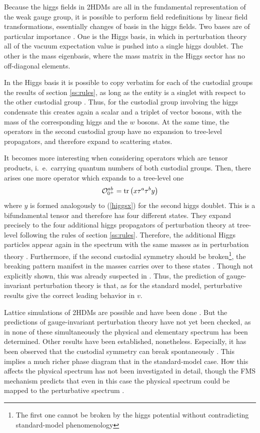 \documentclass[final,twoside,12pt]{article}
\newcommand*{\no}{\noindent}
\newcommand*{\be}{\begin{equation}}
\newcommand*{\ee}{\end{equation}}
\newcommand*{\pref}[1]{(\ref{#1})}
\newcommand*{\tr}{\mathrm{tr}}
\newcommand*{\1}{1\!\!\!\bot}
\newcommand*{\op}{{\cal O}}
\begin{document}
Because the higgs fields in 2HDMs are all in the fundamental representation of the weak gauge group, it is possible to perform field redefinitions by linear field transformations, essentially changes of basis in the higgs fields. Two bases are of particular importance \cite{Branco:2011iw,Ivanov:2017dad}. One is the Higgs basis, in which in perturbation theory all of the vacuum expectation value is pushed into a single higgs doublet. The other is the mass eigenbasis, where the mass matrix in the Higgs sector has no off-diagonal elements.

In the Higgs basis it is possible to copy verbatim for each of the custodial groups the results of section \ref{ss:rules}, as long as the entity is a singlet with respect to the other custodial group \cite{Maas:2016qpu}. Thus, for the custodial group involving the higgs condensate this creates again a scalar and a triplet of vector bosons, with the mass of the corresponding higgs and the $w$ bosons. At the same time, the operators in the second custodial group have no expansion to tree-level propagators, and therefore expand to scattering states.

It becomes more interesting when considering operators which are tensor products, i.\ e.\ carrying quantum numbers of both custodial groups. Then, there arises one more operator which expands to a tree-level one \cite{Maas:2016qpu}
\be
\op_{0^+}^{ab}=\tr\left(x\tau^a\tau^by\right)\label{hdmtensor}
\ee
\no where $y$ is formed analogously to \pref{higgsx} for the second higgs doublet. This is a bifundamental tensor and therefore has four different states. They expand precisely to the four additional higgs propagators of perturbation theory at tree-level following the rules of section \ref{ss:rules}. Therefore, the additional Higgs particles appear again in the spectrum with the same masses \cite{Maas:2016qpu} as in perturbation theory \cite{Branco:2011iw,Ivanov:2017dad}. Furthermore, if the second custodial symmetry should be broken\footnote{The first one cannot be broken by the higgs potential without contradicting standard-model phenomenology}, the breaking pattern manifest in the masses carries over to these states \cite{Maas:2016qpu}. Though not explicitly shown, this was already suspected in \cite{Frohlich:1981yi}. Thus, the prediction of gauge-invariant perturbation theory is that, as for the standard model, perturbative results give the correct leading behavior in $v$.

Lattice simulations of 2HDMs are possible and have been done \cite{Wurtz:2009gf,Lewis:2010ps,Maas:2014nya}. But the predictions of gauge-invariant perturbation theory have not yet been checked, as in none of these simultaneously the physical and elementary spectrum has been determined. Other results have been established, nonetheless. Especially, it has been observed that the custodial symmetry can break spontaneously \cite{Wurtz:2009gf,Lewis:2010ps}. This implies a much richer phase diagram that in the standard-model case. How this affects the physical spectrum has not been investigated in detail, though the FMS mechanism predicts that even in this case the physical spectrum could be mapped to the perturbative spectrum \cite{Maas:2016qpu}.
\end{document}
